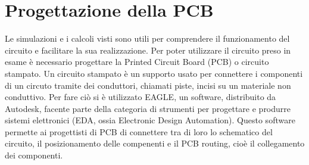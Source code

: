 \section{Progettazione della PCB}
Le simulazioni e i calcoli visti sono utili per comprendere il funzionamento del circuito e facilitare la sua realizzazione. Per poter utilizzare il
circuito preso in esame è necessario progettare la Printed Circuit Board (PCB) o circuito stampato. Un circuito stampato è un supporto
usato per connettere i componenti di un circuto tramite dei conduttori, chiamati piste, incisi su un materiale non conduttivo.
Per fare ciò si è utilizzato EAGLE, un software, distribuito da Autodesk, facente parte della categoria di strumenti per progettare e produrre
sistemi elettronici (EDA, ossia Electronic Design Automation). 
Questo software permette ai progettisti di PCB di connettere tra di loro lo schematico del circuito, il posizionamento delle compenenti e il PCB 
routing, cioè il collegamento dei componenti.

